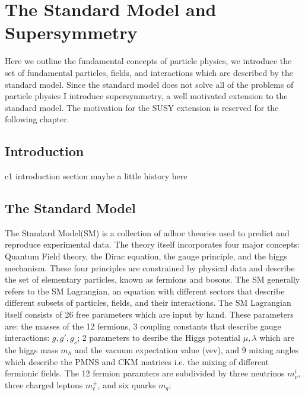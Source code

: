 



\setcounter{secnumdepth}{3}
\setcounter{tocdepth}{3}
\setlength{\parskip}{\smallskipamount}
\setlength{\parindent}{0pt}


\makeatletter


\providecommand{\tabularnewline}{\\}


\makeatother

%

\chapter{The Standard Model and Supersymmetry}

\begin{chapterabstract}
Here we outline the fundamental concepts of particle physics, we introduce the set of fundamental particles, fields, and interactions which are described by the standard model. Since the standard model does not solve all of the problems of particle physics I introduce supersymmetry, a well motivated extension to the standard model. The motivation for the SUSY extension is reserved for the following chapter.

\end{chapterabstract}

\section{Introduction}

c1 introduction section
maybe a little history here

\section{The Standard Model}

The Standard Model(SM) is a collection of adhoc theories used to predict and reproduce experimental data. The theory itself incorporates four major concepts: Quantum Field theory, the Dirac equation, the gauge principle, and the higgs mechanism. These four principles are constrained by physical data and describe the set of elementary particles, known as fermions and bosons. The SM generally refers to the SM Lagrangian, an equation with different sectors that describe different subsets of particles, fields, and their interactions. The SM Lagrangian itself consists of 26 free parameters which are input by hand. These parameters are: the masses of the 12 fermions, 3 coupling constants that describe gauge interactions: $g, g', g_s$; 2 parameters to desribe the Higgs potential $\mu, \lambda$ which are the higgs mass $m_h$ and the vacuum expectation value (vev), and 9 mixing angles which describe the  PMNS and CKM matrices i.e. the mixing of different fermionic fields. The 12 fermion paramters are subdivided by three neutrinos $m_\nu^i$, three charged leptons $m_\ell^\pm$, and six quarks $m_q$; 

